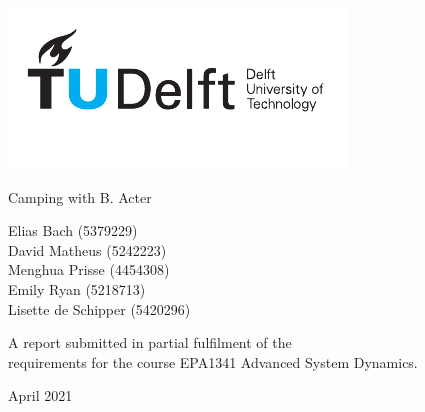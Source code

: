 \documentclass[a4paper,11, oneside]{article}
\begin{document}
	\begin{center}
		\includegraphics[width=\textwidth]{logo.pdf}
	\end{center}
	
	\begin{center}
		
		\Huge Camping with B. Acter\\		
		
	\end{center}
	\vspace{2.5cm}
	\begin{center}
		\Large Elias Bach (5379229) \\  David Matheus (5242223) \\ Menghua Prisse (4454308) \\ Emily Ryan (5218713) \\ Lisette de Schipper (5420296)
	\end{center}
	\vspace*{-2.5cm}
	
	\vspace{8cm}
	\begin{center}
		{\large A report submitted in partial fulfilment of the \\requirements for the course EPA1341 Advanced System Dynamics.}
	\end{center}
	
	\begin{center}
		{\large April 2021}
	\end{center}		

	\newpage
\end{document}
